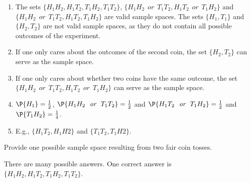 \begin{exercise}
	\begin{solution} 
		\begin{enumerate}
			\item The sets $\{H_1H_2,H_1T_2,T_1H_2,T_1T_2\}$, $\{H_1H_2 ~~\textit{or}~~ T_1T_2, H_1T_2 ~~\textit{or}~~ T_1H_2 \}$ and \\$\{H_1H_2 ~~\textit{or}~~ T_1T_2, H_1T_2, T_1H_2 \}$ are valid sample spaces. The sets $\{H_1, T_1\}$ and $\{H_2, T_2\}$ are not valid sample spaces, as they do not contain all possible outcomes of the experiment.
			\item If one only cares about the outcomes of the second coin, the set $\{H_2, T_2\}$ can serve as the sample space.
			\item If one only cares about whether two coins have the same outcome, the set \\$\{H_1H_2 ~~\textit{or}~~ T_1T_2,  H_1T_2 ~~\textit{or}~~ T_1H_2 \}$ can serve as the sample space.
			\item $\P{H_1} = \frac{1}{2}$, $\P{H_1H_2 ~~\textit{or}~~ T_1T_2} = \frac{1}{2}$ and $\P{H_1T_2 ~~\textit{or}~~ T_1H_2} = \frac{1}{2}$ and $\P{T_1H_2} = \frac{1}{4}$.
			\item E.g.,  $\{H_1T_2, H_1H2\}$ and $\{T_1T_2, T_1H2\}$.
		\end{enumerate}
	\end{solution}
\end{exercise}
	
\begin{exercise} \label{ex:chap01:02}
	Provide one possible sample space resulting from two fair coin tosses.  
	\begin{solution}
		There are many possible answers. One correct answer is $\{H_1H_2,H_1T_2,T_1H_2,T_1T_2\}$.
	\end{solution}
\end{exercise}
	
